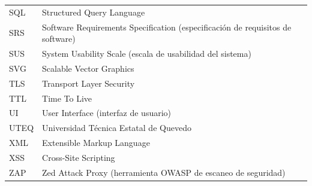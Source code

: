 \documentclass[12pt,a4paper]{report}
\begin{document}
\begin{center}
\begin{longtable}{@{}ll@{}}
SQL & Structured Query Language \\
SRS & Software Requirements Specification (especificación de requisitos de software) \\
SUS & System Usability Scale (escala de usabilidad del sistema) \\
SVG & Scalable Vector Graphics \\
TLS & Transport Layer Security \\
TTL & Time To Live \\
UI & User Interface (interfaz de usuario) \\
UTEQ & Universidad Técnica Estatal de Quevedo \\
XML & Extensible Markup Language \\
XSS & Cross-Site Scripting \\
ZAP & Zed Attack Proxy (herramienta OWASP de escaneo de seguridad) \\
\end{longtable}
\end{center}

\newpage



















\end{document}
